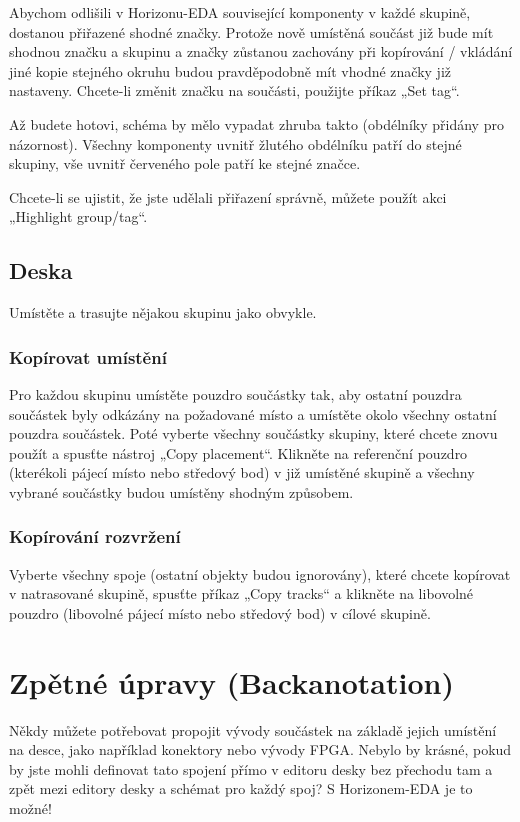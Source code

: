 \documentclass[letterpaper,10pt,czech]{sphinxmanual}
\begin{document}
Abychom odlišili v Horizonu-EDA související komponenty v každé skupině, dostanou přiřazené shodné značky. Protože nově umístěná součást již bude mít shodnou značku a skupinu a značky zůstanou zachovány při kopírování / vkládání jiné kopie stejného okruhu budou pravděpodobně mít vhodné značky již nastaveny. Chcete-li změnit značku na součásti, použijte příkaz „Set tag“.

Až budete hotovi, schéma by mělo vypadat zhruba takto (obdélníky přidány pro názornost). Všechny komponenty uvnitř žlutého obdélníku patří do stejné skupiny, vše uvnitř červeného pole patří ke stejné značce.

\noindent{}

Chcete-li se ujistit, že jste udělali přiřazení správně, můžete použít akci „Highlight group/tag“.


\section{Deska}
\label{\detokenize{copy-layout-placement:deska}}
Umístěte a trasujte nějakou skupinu jako obvykle.


\subsection{Kopírovat umístění}
\label{\detokenize{copy-layout-placement:kopirovat-umisteni}}
Pro každou skupinu umístěte pouzdro součástky tak, aby ostatní pouzdra součástek byly odkázány na požadované místo a umístěte okolo všechny ostatní pouzdra součástek. Poté vyberte všechny součástky skupiny, které chcete znovu použít a spusťte nástroj „Copy placement“. Klikněte na referenční pouzdro (kterékoli pájecí místo nebo středový bod) v již umístěné skupině a všechny vybrané součástky budou umístěny shodným způsobem.


\subsection{Kopírování rozvržení}
\label{\detokenize{copy-layout-placement:kopirovani-rozvrzeni}}
Vyberte všechny spoje (ostatní objekty budou ignorovány), které chcete kopírovat
v natrasované skupině, spusťte příkaz „Copy tracks“ a klikněte na libovolné pouzdro
(libovolné pájecí místo nebo středový bod) v cílové skupině.


\chapter{Zpětné úpravy (Backanotation)}
\label{\detokenize{backannotation:zpetne-upravy-backanotation}}\label{\detokenize{backannotation::doc}}
Někdy můžete potřebovat propojit vývody součástek na základě jejich
umístění na desce, jako například konektory nebo vývody FPGA. Nebylo by krásné, pokud by jste mohli definovat tato spojení přímo v editoru desky bez přechodu tam a zpět mezi editory desky a  schémat pro každý spoj? S Horizonem-EDA je to možné!
\end{document}
